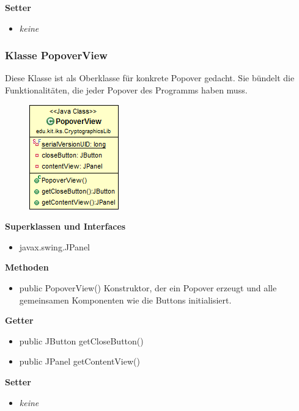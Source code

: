 \documentclass{article}
\begin{document}
      \textbf{Setter}
      \begin{itemize}
        \item \textit{keine}
      \end{itemize}
	
	\subsubsection{Klasse PopoverView}
	  Diese Klasse ist als Oberklasse für konkrete Popover gedacht. Sie
	  bündelt die Funktionalitäten, die jeder Popover des Programms haben muss.
	
      \begin{figure}[H]
        \centering
        \includegraphics{resources/edu-kit-iks-CryptographicsLib-PopoverView}
      \end{figure}
	
      \textbf{Superklassen und Interfaces}
      \begin{itemize}
        \item javax.swing.JPanel
      \end{itemize}
	
      \textbf{Methoden}
      \begin{itemize}
        \item public PopoverView() \newline
          Konstruktor, der ein Popover erzeugt und alle gemeinsamen Komponenten wie
          die Buttons initialisiert.
      \end{itemize}
      
      \textbf{Getter}
      \begin{itemize}
		\item public JButton getCloseButton()
		\item public JPanel getContentView()
      \end{itemize}
      
      \textbf{Setter}
      \begin{itemize}
        \item \textit{keine}
      \end{itemize}
	
\end{document}
